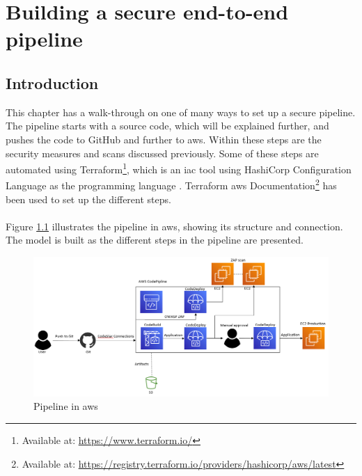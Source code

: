 \newpage
\thispagestyle{empty}
\mbox{}

\chapter{Building a secure end-to-end pipeline}
\label{Deployment}
\section{Introduction}
This chapter has a walk-through on one of many ways to set up a secure pipeline. The pipeline starts with a source code, which will be explained further, and pushes the code to GitHub and further to \acrshort{aws}. Within these steps are the security measures and scans discussed previously. Some of these steps are automated using Terraform\footnote{Available at: \url{https://www.terraform.io/}}, which is an \gls{iac} tool using HashiCorp Configuration Language as the programming language \cite{hcl}. Terraform \acrshort{aws} Documentation\footnote{Available at: \url{https://registry.terraform.io/providers/hashicorp/aws/latest}} has been used to set up the different steps.
\\~\\
Figure \ref{fig: Pipeline in AWS} illustrates the pipeline in \acrshort{aws}, showing its structure and connection. The model is built as the different steps in the \gls{pipeline} are presented.

\vspace{2mm}
\begin{figure}[H]
    \centering
    \includegraphics[width=1\columnwidth]{Images/aws-piplin-7.png}
    \caption{Pipeline in \acrshort{aws}}
    \label{fig: Pipeline in AWS}
\end{figure}

